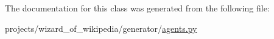 The documentation for this class was generated from the following file\+:\begin{DoxyCompactItemize}
\item 
projects/wizard\+\_\+of\+\_\+wikipedia/generator/\hyperlink{projects_2wizard__of__wikipedia_2generator_2agents_8py}{agents.\+py}\end{DoxyCompactItemize}

